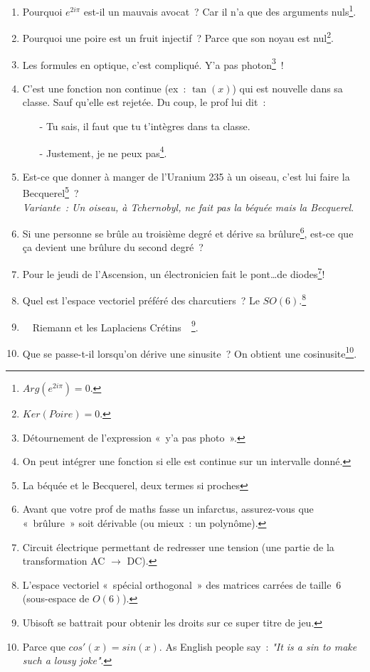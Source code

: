 \documentclass[10pt,a5paper,fullpage]{book}
\begin{document}
\begin{enumerate}
		\item Pourquoi $e^{2i\pi}$ est-il un mauvais avocat~? Car il n’a que des arguments nuls\footnote{$Arg(e^{2i\pi}) = 0$.}. 
		\item Pourquoi une poire est un fruit injectif~? Parce que son noyau est nul\footnote{$Ker(Poire) = 0$.}.
		\item Les formules en optique, c’est compliqué. Y’a pas photon\footnote{Détournement de l’expression « y’a pas photo ».}~!
		\item C’est une fonction non continue (ex~: $\tan(x)$) qui est nouvelle dans sa classe. Sauf qu’elle est rejetée. Du coup, le prof lui dit~: 
		\begin{itemize}
			\item[-] Tu sais, il faut que tu t’intègres dans ta classe.
			\item[-] Justement, je ne peux pas\footnote{On peut intégrer une fonction si elle est continue sur un intervalle donné.}.
		\end{itemize}
		\item Est-ce que donner à manger de l’Uranium 235 à un oiseau, c’est lui faire la Becquerel\footnote{La béquée et le Becquerel, deux termes si proches}~? \\\textit{Variante~: Un oiseau, à Tchernobyl, ne fait pas la béquée mais la Becquerel}.
		\item Si une personne se brûle au troisième degré et dérive sa brûlure\footnote{Avant que votre prof de maths fasse un infarctus, assurez-vous que « brûlure » soit dérivable (ou mieux~: un polynôme).}, est-ce que ça devient une brûlure du second degré~?
		\item  Pour le jeudi de l’Ascension, un électronicien fait le pont\ldots de diodes\footnote{Circuit électrique permettant de redresser une tension (une partie de la transformation AC $\rightarrow$ DC).}!
		\item Quel est l’espace vectoriel préféré des charcutiers~? Le $SO(6)$.\footnote{L’espace vectoriel « spécial orthogonal » des matrices carrées de taille~6 (sous-espace de $O(6)$).}
		\item \guillemotleft~ Riemann et les Laplaciens Crétins ~\guillemotright\footnote{Ubisoft se battrait pour obtenir les droits sur ce super titre de jeu.}.
		\item Que se passe-t-il lorsqu’on dérive une sinusite~? On obtient une cosinusite\footnote{Parce que $cos'(x) = sin(x)$. As English people say~: \textit{"It is a sin to make such a lousy joke"}.}.
		

\end{enumerate}
\end{document}
